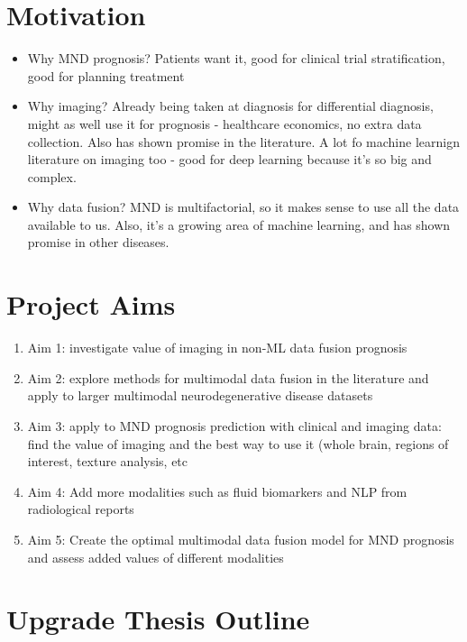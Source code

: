 \section{Motivation}

\begin{itemize}
    \item Why MND prognosis? Patients want it, good for clinical trial stratification, good for planning treatment
    \item Why imaging? Already being taken at diagnosis for differential diagnosis, might as well use it for prognosis - healthcare economics, no extra data collection. Also has shown promise in the literature. A lot fo machine learnign literature on imaging too - good for deep learning because it's so big and complex.
    \item Why data fusion? MND is multifactorial, so it makes sense to use all the data available to us. Also, it's a growing area of machine learning, and has shown promise in other diseases.
\end{itemize}

\section{Project Aims}

\begin{enumerate}
    \item Aim 1: investigate value of imaging in non-ML data fusion prognosis
    \item Aim 2: explore methods for multimodal data fusion in the literature and apply to larger multimodal neurodegenerative disease datasets
    \item Aim 3: apply to MND prognosis prediction with clinical and imaging data: find the value of imaging and the best way to use it (whole brain, regions of interest, texture analysis, etc
    \item Aim 4: Add more modalities such as fluid biomarkers and NLP from radiological reports
    \item Aim 5: Create the optimal multimodal data fusion model for MND prognosis and assess added values of different modalities
\end{enumerate}

\section{Upgrade Thesis Outline}